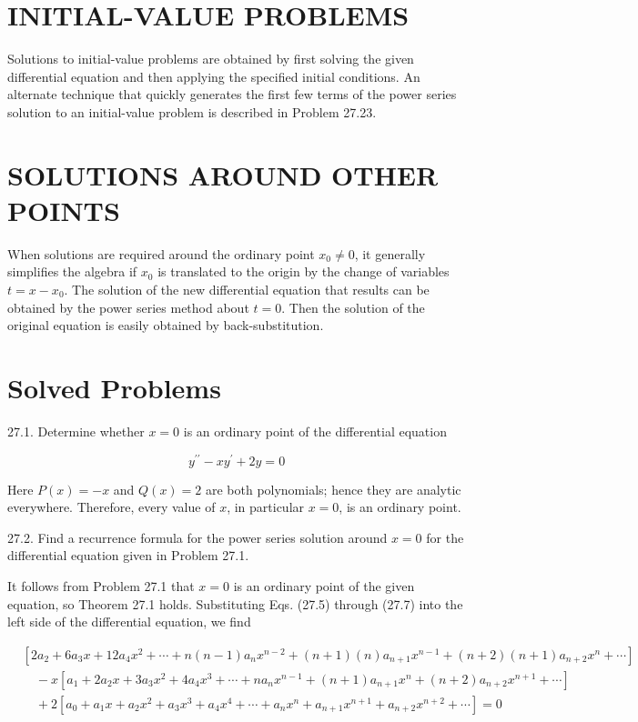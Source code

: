 \documentclass[10pt]{article}
\begin{document}
\section*{INITIAL-VALUE PROBLEMS}
Solutions to initial-value problems are obtained by first solving the given differential equation and then applying the specified initial conditions. An alternate technique that quickly generates the first few terms of the power series solution to an initial-value problem is described in Problem 27.23.

\section*{SOLUTIONS AROUND OTHER POINTS}
When solutions are required around the ordinary point $x_{0} \neq 0$, it generally simplifies the algebra if $x_{0}$ is translated to the origin by the change of variables $t=x-x_{0}$. The solution of the new differential equation that results can be obtained by the power series method about $t=0$. Then the solution of the original equation is easily obtained by back-substitution.

\section*{Solved Problems}
27.1. Determine whether $x=0$ is an ordinary point of the differential equation

$$
y^{\prime \prime}-x y^{\prime}+2 y=0
$$

Here $P(x)=-x$ and $Q(x)=2$ are both polynomials; hence they are analytic everywhere. Therefore, every value of $x$, in particular $x=0$, is an ordinary point.

27.2. Find a recurrence formula for the power series solution around $x=0$ for the differential equation given in Problem 27.1.

It follows from Problem 27.1 that $x=0$ is an ordinary point of the given equation, so Theorem 27.1 holds. Substituting Eqs. (27.5) through (27.7) into the left side of the differential equation, we find

$$
\begin{aligned}
& {\left[2 a_{2}+6 a_{3} x+12 a_{4} x^{2}+\cdots+n(n-1) a_{n} x^{n-2}+(n+1)(n) a_{n+1} x^{n-1}+(n+2)(n+1) a_{n+2} x^{n}+\cdots\right]} \\
& \quad-x\left[a_{1}+2 a_{2} x+3 a_{3} x^{2}+4 a_{4} x^{3}+\cdots+n a_{n} x^{n-1}+(n+1) a_{n+1} x^{n}+(n+2) a_{n+2} x^{n+1}+\cdots\right] \\
& \quad+2\left[a_{0}+a_{1} x+a_{2} x^{2}+a_{3} x^{3}+a_{4} x^{4}+\cdots+a_{n} x^{n}+a_{n+1} x^{n+1}+a_{n+2} x^{n+2}+\cdots\right]=0
\end{aligned}
$$
\end{document}
